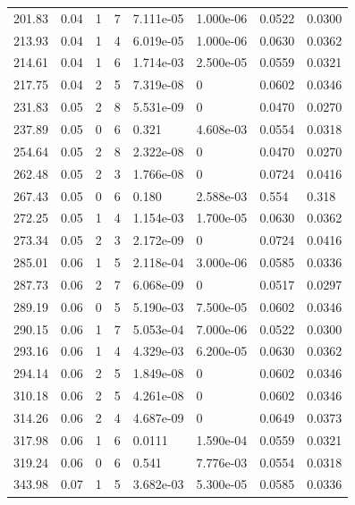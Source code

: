 \documentclass[preview]{standalone}
\begin{document}
{{{\begin{tabular}{L{1.2cm}C{1.2cm} C{0.3cm}C{0.5cm} C{1.4cm}C{1.4cm} C{1.4cm}C{1.4cm}}
  201.83  &  0.04  & 1     &  7 &  7.111e-05  & 1.000e-06  & 0.0522 &  0.0300   \\ 
  213.93  &  0.04  & 1     &  4 &  6.019e-05  & 1.000e-06  & 0.0630 &  0.0362   \\ 
  214.61  &  0.04  & 1     &  6 &  1.714e-03  & 2.500e-05  & 0.0559 &  0.0321   \\ 
  217.75  &  0.04  & 2     &  5 &  7.319e-08  & 0  & 0.0602 &  0.0346   \\ 
  231.83  &  0.05  & 2     &  8 &  5.531e-09  & 0  & 0.0470 &  0.0270   \\ 
  237.89  &  0.05  & 0     &  6 &  0.321  & 4.608e-03  & 0.0554 &  0.0318   \\ 
  254.64  &  0.05  & 2     &  8 &  2.322e-08  & 0  & 0.0470 &  0.0270   \\ 
  262.48  &  0.05  & 2     &  3 &  1.766e-08  & 0  & 0.0724 &  0.0416   \\ 
  267.43  &  0.05  & 0     &  6 &  0.180  & 2.588e-03  & 0.554 &  0.318   \\ 
  272.25  &  0.05  & 1     &  4 &  1.154e-03  & 1.700e-05  & 0.0630 &  0.0362   \\ 
  273.34  &  0.05  & 2     &  3 &  2.172e-09  & 0  & 0.0724 &  0.0416   \\ 
  285.01  &  0.06  & 1     &  5 &  2.118e-04  & 3.000e-06  & 0.0585 &  0.0336   \\ 
  287.73  &  0.06  & 2     &  7 &  6.068e-09  & 0  & 0.0517 &  0.0297   \\ 
  289.19  &  0.06  & 0     &  5 &  5.190e-03  & 7.500e-05  & 0.0602 &  0.0346   \\ 
  290.15  &  0.06  & 1     &  7 &  5.053e-04  & 7.000e-06  & 0.0522 &  0.0300   \\ 
  293.16  &  0.06  & 1     &  4 &  4.329e-03  & 6.200e-05  & 0.0630 &  0.0362   \\ 
  294.14  &  0.06  & 2     &  5 &  1.849e-08  & 0  & 0.0602 &  0.0346   \\ 
  310.18  &  0.06  & 2     &  5 &  4.261e-08  & 0  & 0.0602 &  0.0346   \\ 
  314.26  &  0.06  & 2     &  4 &  4.687e-09  & 0  & 0.0649 &  0.0373   \\ 
  317.98  &  0.06  & 1     &  6 &  0.0111  & 1.590e-04  & 0.0559 &  0.0321   \\ 
  319.24  &  0.06  & 0     &  6 &  0.541  & 7.776e-03  & 0.0554 &  0.0318   \\ 
  343.98  &  0.07  & 1     &  5 &  3.682e-03  & 5.300e-05  & 0.0585 &  0.0336   \\ 

\end{tabular}}}}
\end{document}
